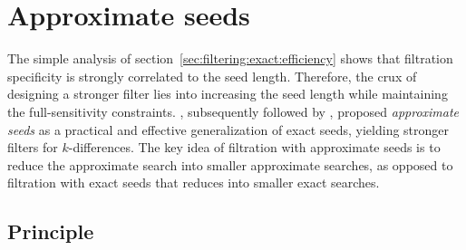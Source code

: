 

\section{Approximate seeds}
\label{sec:seeds-apx}

The simple analysis of section~\ref{sec:filtering:exact:efficiency} shows that filtration specificity is strongly correlated to the seed length.
Therefore, the crux of designing a stronger filter lies into increasing the seed length while maintaining the full-sensitivity constraints.
\citeauthor{Myers1994}, subsequently followed by \citeauthor{Navarro2000}, proposed \emph{approximate seeds} as a practical and effective generalization of exact seeds, yielding stronger filters for $k$-differences.
The key idea of filtration with approximate seeds is to reduce the approximate search into smaller approximate searches, as opposed to filtration with exact seeds that reduces into smaller exact searches.

\subsection{Principle}


